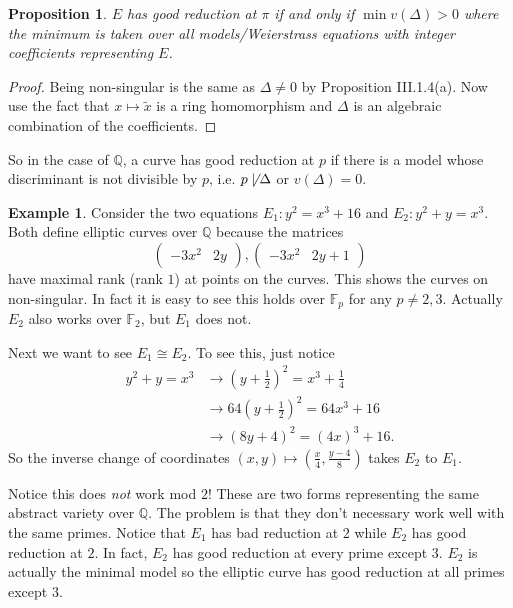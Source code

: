 \documentclass[11pt]{article}
\newcommand{\BB}[1]{\mathbb{#1}} %
\newcommand{\QQ}{\BB{Q}}
\newcommand{\FF}{\BB{F}}
\theoremstyle{plain}%
\newtheorem{prop}[thm]{Proposition}
\theoremstyle{definition}
\newtheorem{ex}[thm]{Example}
\theoremstyle{remark}
\begin{document}
\begin{prop}
	$E$ has good reduction at $\pi$ if and only if $\min v(\Delta)>0$ where the minimum is taken over all models/Weierstrass equations with integer coefficients representing $E$.
\end{prop}
\begin{proof}
	Being non-singular is the same as $\Delta\neq 0$ by Proposition III.1.4(a). Now use the fact that $x\mapsto\tilde{x}$ is a ring homomorphism and $\Delta$ is an algebraic combination of the coefficients.
\end{proof}

So in the case of $\QQ$, a curve has good reduction at $p$ if there is a model whose discriminant is not divisible by $p$, i.e. $p\not\mid\Delta$ or $v(\Delta) = 0$.

\begin{ex}
	Consider the two equations $E_1: y^2=x^3+16$ and $E_2: y^2 + y = x^3$. Both define elliptic curves over $\QQ$ because the matrices
	$$
	\begin{pmatrix}
		-3x^2 & 2y
	\end{pmatrix}
	,
	\begin{pmatrix}
		-3x^2 & 2y+1
	\end{pmatrix}
	$$
	have maximal rank (rank $1$) at points on the curves. This shows the curves on non-singular. In fact it is easy to see this holds over $\FF_p$ for any $p\neq 2,3$. Actually $E_2$ also works over $\FF_2$, but $E_1$ does not.

	Next we want to see $E_1\cong E_2$. To see this, just notice
	\begin{align*}
		y^2 + y = x^3
		&\to
		\left(y+\frac{1}{2}\right)^2 = x^3 + \frac{1}{4}
		\\
		&\to
		64\left(y+\frac{1}{2}\right)^2 = 64x^3 + 16
		\\
		&\to
		\left(8y+4\right)^2 = (4x)^3 + 16.
	\end{align*}
	So the inverse change of coordinates $(x,y)\mapsto \left(\frac{x}{4},\frac{y-4}{8}\right)$ takes $E_2$ to $E_1$.

	Notice this does \emph{not} work mod $2$! These are two forms representing the same abstract variety over $\QQ$. The problem is that they don't necessary work well with the same primes. Notice that $E_1$ has bad reduction at $2$ while $E_2$ has good reduction at $2$. In fact, $E_2$ has good reduction at every prime except $3$. $E_2$ is actually the minimal model so the elliptic curve has good reduction at all primes except $3$.
\end{ex}
\end{document}
